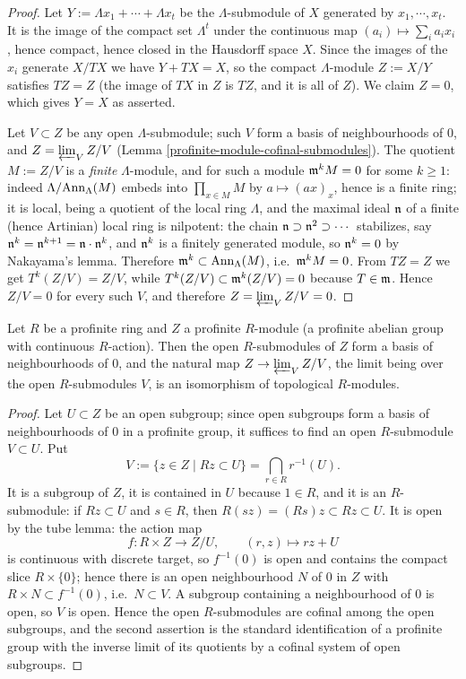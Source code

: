 \begin{proof}
\leanok
Let $Y:=\Lambda x_1+\cdots+\Lambda x_t$ be the $\Lambda$-submodule
of $X$ generated by $x_1,\cdots,x_t$.
It is the image of the compact set $\Lambda^t$ under the continuous map
$(a_i)\mapsto\sum_ia_ix_i$, hence compact, hence closed in the Hausdorff space
$X$.
Since the images of the $x_i$ generate $X/TX$ we have $Y+TX=X$, so the compact
$\Lambda$-module $Z:=X/Y$ satisfies $TZ=Z$ (the image of $TX$ in $Z$ is $TZ$,
and it is all of $Z$).
We claim $Z=0$, which gives $Y=X$ as asserted.

Let $V\subset Z$ be any open $\Lambda$-submodule; such $V$ form a basis of
neighbourhoods of $0$, and $Z=\varprojlim_VZ/V$
(Lemma \ref{profinite-module-cofinal-submodules}).
The quotient $M:=Z/V$ is a \emph{finite} $\Lambda$-module, and for such a
module ${\mathfrak{m}}^kM=0$ for some $k\geq 1$: indeed $\Lambda/{\mathrm{Ann}}_\Lambda(M)$ embeds
into $\prod_{x\in M}M$ by $a\mapsto(ax)_x$, hence is a finite ring; it is local,
being a quotient of the local ring $\Lambda$, and the maximal ideal ${\mathfrak{n}}$ of a
finite (hence Artinian) local ring is nilpotent: the chain
${\mathfrak{n}}\supset{\mathfrak{n}}^2\supset\cdots$ stabilizes, say ${\mathfrak{n}}^k={\mathfrak{n}}^{k+1}={\mathfrak{n}}\cdot{\mathfrak{n}}^k$,
and ${\mathfrak{n}}^k$ is a finitely generated module, so ${\mathfrak{n}}^k=0$ by Nakayama's lemma.
Therefore ${\mathfrak{m}}^k\subset{\mathrm{Ann}}_\Lambda(M)$, i.e.~${\mathfrak{m}}^kM=0$.
From $TZ=Z$ we get $T^k(Z/V)=Z/V$, while
$T^k(Z/V)\subset{\mathfrak{m}}^k(Z/V)=0$ because $T\in{\mathfrak{m}}$.
Hence $Z/V=0$ for every such $V$, and therefore $Z=\varprojlim_VZ/V=0$.
\end{proof}

\begin{lem}
\label{profinite-module-cofinal-submodules}
Let $R$ be a profinite ring and $Z$ a profinite $R$-module (a profinite abelian
group with continuous $R$-action).
Then the open $R$-submodules of $Z$ form a basis of neighbourhoods of $0$, and
the natural map $Z\to\varprojlim_VZ/V$, the limit being over the open
$R$-submodules $V$, is an isomorphism of topological $R$-modules.
\end{lem}

\begin{proof}
Let $U\subset Z$ be an open subgroup; since open subgroups form a basis of
neighbourhoods of $0$ in a profinite group, it suffices to find an open
$R$-submodule $V\subset U$.
Put
$$V:=\{z\in Z\mid Rz\subset U\}=\bigcap_{r\in R}r^{-1}(U).$$
It is a subgroup of $Z$, it is contained in $U$ because $1\in R$, and it is an
$R$-submodule: if $Rz\subset U$ and $s\in R$, then $R(sz)=(Rs)z\subset Rz\subset
U$.
It is open by the tube lemma: the action map
$$f:R\times Z\to Z/U,\qquad (r,z)\mapsto rz+U$$
is continuous with discrete target, so $f^{-1}(0)$ is open and contains the
compact slice $R\times\{0\}$; hence there is an open neighbourhood $N$ of $0$ in
$Z$ with $R\times N\subset f^{-1}(0)$, i.e.~$N\subset V$.
A subgroup containing a neighbourhood of $0$ is open, so $V$ is open.
Hence the open $R$-submodules are cofinal among the open subgroups, and the
second assertion is the standard identification of a profinite group with the
inverse limit of its quotients by a cofinal system of open subgroups.
\end{proof}

